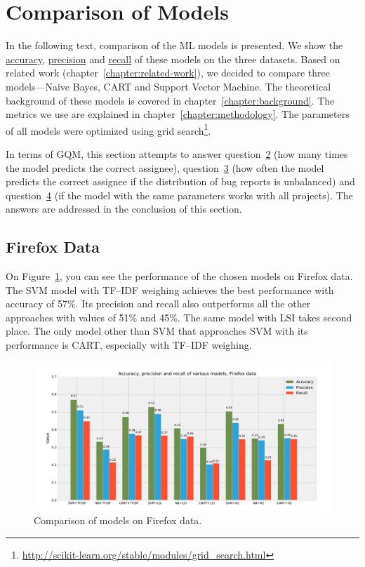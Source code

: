 \section{Comparison of Models}

In the following text, comparison of the ML models is presented. We show the \hyperlink{metric:a}{accuracy}, \hyperlink{metric:p}{precision} and \hyperlink{metric:r}{recall} of these models on the three datasets. Based on related work (chapter~\ref{chapter:related-work}), we decided to compare three models---Naive Bayes, CART and Support Vector Machine. The theoretical background of these models is covered in chapter~\ref{chapter:background}. The metrics we use are explained in chapter~\ref{chapter:methodology}. The parameters of all models were optimized using grid search\footnote{\url{http://scikit-learn.org/stable/modules/grid\_search.html}}.

In terms of GQM, this section attempts to answer question~\hyperlink{question:2}{2} (how many times the model predicts the correct assignee), question~\hyperlink{question:3}{3} (how often the model predicts the correct assignee if the distribution of bug reports is unbalanced) and question~\hyperlink{question:4}{4} (if the model with the same parameters works with all projects). The answers are addressed in the conclusion of this section.

\subsection{Firefox Data}

On Figure~\ref{fig:results.models.firefox}, you can see the performance of the chosen models on Firefox data. The SVM model with TF--IDF weighing achieves the best performance with accuracy of 57\%. Its precision and recall also outperforms all the other approaches with values of 51\% and 45\%. The same model with LSI takes second place. The only model other than SVM that approaches SVM with its performance is CART, especially with TF--IDF weighing.

\begin{figure}[htbp]
    \centering
        \includegraphics[width=\textwidth]{./images/comparison_of_models/firefox.pdf}
    \caption{Comparison of models on Firefox data.}
    \label{fig:results.models.firefox}
\end{figure}

